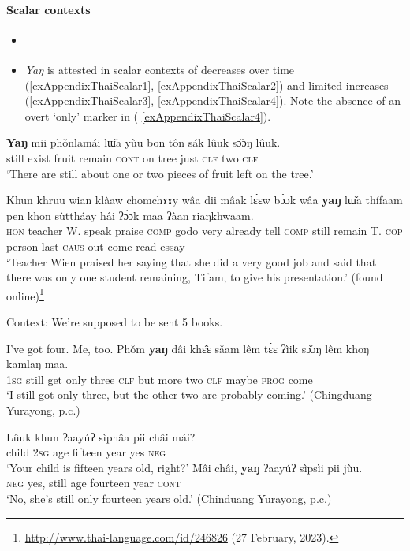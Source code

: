 \paragraph{Scalar contexts}\label{appendixThaiScalar}
\begin{itemize}
	\item \textcite{Zhang2017}
	\item \textit{Yaŋ} is attested in scalar contexts of decreases over time (\ref{exAppendixThaiScalar1}, \ref{exAppendixThaiScalar2}) and limited increases (\ref{exAppendixThaiScalar3}, \ref{exAppendixThaiScalar4}). Note the absence of an overt \lq only\rq{ }marker in ( \ref{exAppendixThaiScalar4}).
\end{itemize}
\begin{exe}
	\ex\label{exAppendixThaiScalar1}
	 \gll \textbf{Yaŋ}	mii	phǒnlamái	lɯ̌a		yùu	bon	tôn	sák	lûuk	sɔ̌ɔŋ	lûuk.\\
	still	exist	fruit		remain	\textsc{cont}	on tree	just	\textsc{clf}	two	\textsc{clf}\\
	\glt \lq There are still about one or two pieces of fruit left on the tree.\rq{ }\parencite[21]{Zhang2017}

		
		\ex\label{exAppendixThaiScalar2}
	\gll Khun	khruu		wian	klàaw	chomchɤɤy	wâa		dii	mâak lɛ́ɛw	bɔ̀ɔk	wâa		\textbf{yaŋ}	lɯ̌a		thífaam	pen	khon		sùttháay hâi	ʔɔ̀ɔk	maa	ʔàan	riaŋkhwaam.\\
	\textsc{hon} teacher W. speak praise \textsc{comp} godo very already tell \textsc{comp} still remain {T.} \textsc{cop} person last \textsc{caus} out come read essay\\
	\glt \lq Teacher Wien praised her saying that she did a very good job and said that there was only one student remaining, Tifam, to give his presentation.\rq{ }(found online)\footnote{\url{http://www.thai-language.com/id/246826} (27 February, 2023).}

		
	\ex\label{exAppendixThaiScalar3}
	Context: We’re supposed to be sent 5 books.
	\begin{xlist}
		 I've got four.
		 Me, too.
		 \gll Phǒm	\textbf{yaŋ}	dâi	khɛ̂ɛ	sǎam	lêm	tɛ̀ɛ	ʔìik	sɔ̌ɔŋ	lêm	khoŋ		kamlaŋ	maa.\\
		1\textsc{sg}	still	get	only	three \textsc{clf}	but	more two	\textsc{clf}	maybe	\textsc{prog}		come\\
	\glt \lq I still got only three, but the other two are probably coming.\rq{ }(Chingduang Yurayong, p.c.)
	\end{xlist}
	
	\ex\label{exAppendixThaiScalar4}
	\begin{xlist}
		\gll Lûuk	khun	ʔaayúʔ	sìphâa	pii	châi	mái?\\
		child 2\textsc{sg} age fifteen year yes \textsc{neg}\\
		\glt \lq Your child is fifteen years old, right?\rq{}
		 \gll Mâi	châi,	\textbf{yaŋ}	ʔaayúʔ	sìpsìi		pii	jùu.\\
		\textsc{neg} yes, still age fourteen year \textsc{cont}\\
		\glt \lq No, she's still only fourteen years old.\rq{ }(Chinduang Yurayong, p.c.)
	\end{xlist}
\end{exe}


